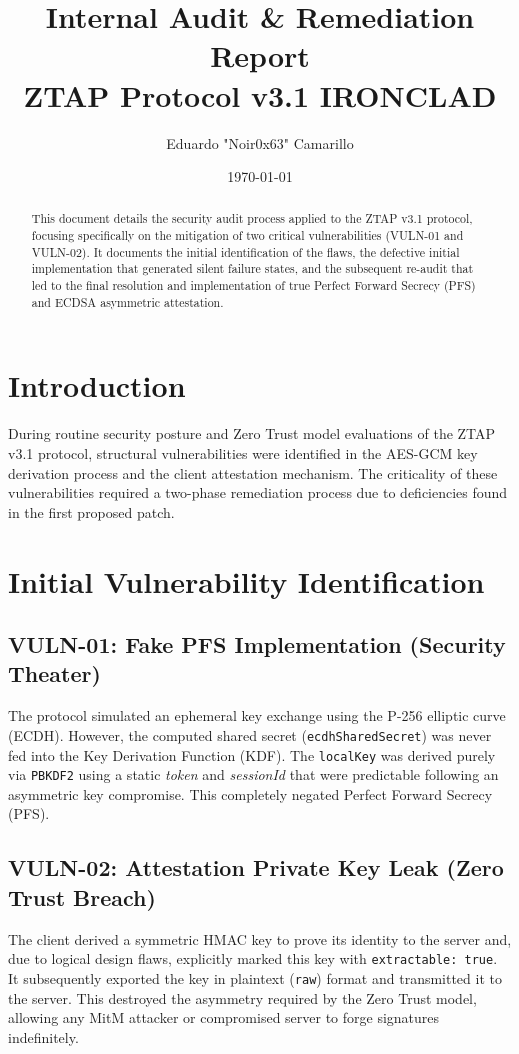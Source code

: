 \documentclass[12pt,a4paper]{article}
\title{\textbf{Internal Audit \& Remediation Report}\\ \Large ZTAP Protocol v3.1 IRONCLAD}
\author{Eduardo "Noir0x63" Camarillo}
\date{\today}
\begin{document}
\maketitle

\begin{abstract}
This document details the security audit process applied to the ZTAP v3.1 protocol, focusing specifically on the mitigation of two critical vulnerabilities (VULN-01 and VULN-02). It documents the initial identification of the flaws, the defective initial implementation that generated silent failure states, and the subsequent re-audit that led to the final resolution and implementation of true Perfect Forward Secrecy (PFS) and ECDSA asymmetric attestation.
\end{abstract}

\tableofcontents
\newpage

\section{Introduction}
During routine security posture and Zero Trust model evaluations of the ZTAP v3.1 protocol, structural vulnerabilities were identified in the AES-GCM key derivation process and the client attestation mechanism. The criticality of these vulnerabilities required a two-phase remediation process due to deficiencies found in the first proposed patch.

\section{Initial Vulnerability Identification}

\subsection{VULN-01: Fake PFS Implementation (Security Theater)}
The protocol simulated an ephemeral key exchange using the P-256 elliptic curve (ECDH). However, the computed shared secret (\texttt{ecdhSharedSecret}) was never fed into the Key Derivation Function (KDF). The \texttt{localKey} was derived purely via \texttt{PBKDF2} using a static \textit{token} and \textit{sessionId} that were predictable following an asymmetric key compromise. This completely negated Perfect Forward Secrecy (PFS).

\subsection{VULN-02: Attestation Private Key Leak (Zero Trust Breach)}
The client derived a symmetric HMAC key to prove its identity to the server and, due to logical design flaws, explicitly marked this key with \texttt{extractable: true}. It subsequently exported the key in plaintext (\texttt{raw}) format and transmitted it to the server. This destroyed the asymmetry required by the Zero Trust model, allowing any MitM attacker or compromised server to forge signatures indefinitely.
\end{document}
